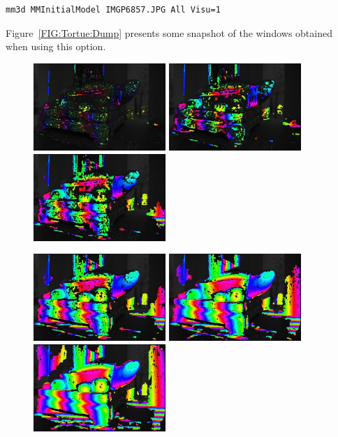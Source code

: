 \begin{verbatim}
mm3d MMInitialModel IMGP6857.JPG All Visu=1
\end{verbatim}

Figure~\ref{FIG:Tortue:Dump} presents some snapshot of the windows obtained when using
this option.

\begin{figure}
\begin{center}
\includegraphics[width=50mm]{FIGS/Tortue/DumpMMTieP_0.jpg}
\includegraphics[width=50mm]{FIGS/Tortue/DumpMMTieP_1.jpg}
\includegraphics[width=50mm]{FIGS/Tortue/DumpMMTieP_2.jpg}

\includegraphics[width=50mm]{FIGS/Tortue/DumpMMTieP_3.jpg}
\includegraphics[width=50mm]{FIGS/Tortue/DumpMMTieP_4.jpg}
\includegraphics[width=50mm]{FIGS/Tortue/DumpMMTieP_5.jpg}


\end{center}
\end{figure}
